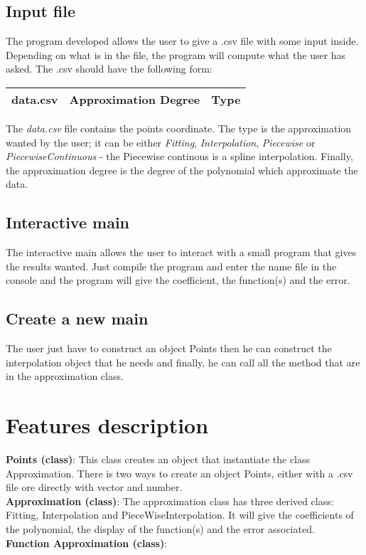 \documentclass[12pt]{article}
\begin{document}
\subsection{Input file}
The program developed allows the user to give a .csv file with some input inside. Depending on what is in the file, the program will compute what the user has asked. The .csv should have the following form:\\
\begin{center}
\begin{tabular}{|c|c|c|}
\hline
data.csv & Approximation Degree & Type  \\
\hline
\end{tabular} 
\end{center}
The \emph{data.csv} file contains the points coordinate. The type is the approximation wanted by the user; it can be either \emph{Fitting}, \emph{Interpolation}, \emph{Piecewise} or \emph{PiecewiseContinuous} - the Piecewise continous is a spline interpolation. Finally, the approximation degree  is the degree of the polynomial which approximate the data.\\

\subsection{Interactive main}
The interactive main allows the user to interact with a small program that gives the results wanted. Just compile the program and enter the name file in the console and the program will give the coefficient, the function(s) and the error.

\subsection{Create a new main}
The user just have to construct an object Points then he can construct the interpolation object that he needs and finally, he can call all the method that are in the approximation class.

\section{Features description}
\textbf{Points (class)}: This class creates an object that instantiate the class Approximation. There is two ways to create an object Points, either with a .csv file ore directly with vector and number.\\
\textbf{Approximation (class)}: The approximation class has three derived class: Fitting, Interpolation and PieceWiseInterpolation. It will give the coefficients of the polynomial, the display of the function(s) and the error associated.\\
\textbf{Function Approximation (class)}:
\end{document}
